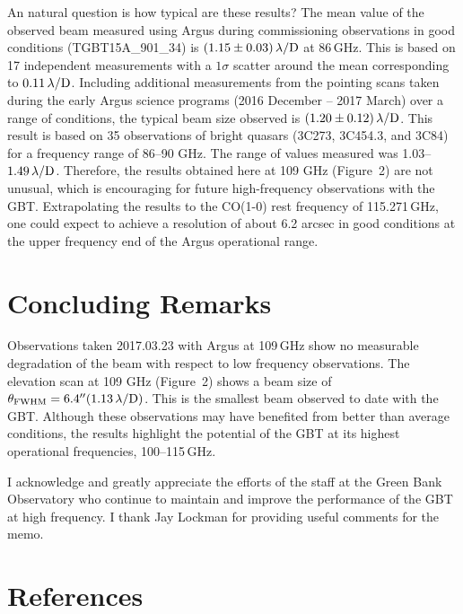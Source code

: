 \documentclass[12pt]{article}
\begin{document}
An natural question is how typical are these results?  The mean value
of the observed beam measured using Argus during commissioning
observations in good conditions (TGBT15A\_901\_34) is
$(1.15\pm0.03)\,\lambda/{\rm D}$ at 86\,GHz.  This is based on 17
independent measurements with a $1\sigma$ scatter around the mean
corresponding to $0.11\,\lambda/{\rm D}$.  Including additional
measurements from the pointing scans taken during the early Argus
science programs (2016 December -- 2017 March) over a range of
conditions, the typical beam size observed is
$(1.20\pm0.12)\,\lambda/{\rm D}$.  This result is based on 35
observations of bright quasars (3C273, 3C454.3, and 3C84) for a
frequency range of 86--90 GHz.  The range of values measured was
1.03--$1.49\,\lambda/{\rm D}$.  Therefore, the results obtained here
at 109 GHz (Figure~2) are not unusual, which is encouraging for future
high-frequency observations with the GBT.  Extrapolating the results
to the CO(1-0) rest frequency of 115.271\,GHz, one could expect to
achieve a resolution of about 6.2 arcsec in good conditions at the
upper frequency end of the Argus operational range.



\section{Concluding Remarks}

Observations taken 2017.03.23 with Argus at 109\,GHz show no
measurable degradation of the beam with respect to low frequency
observations.  The elevation scan at 109 GHz (Figure~2) shows a beam
size of $\theta_{\rm FWHM} = 6.4^{\prime\prime} (1.13\,\lambda/{\rm
  D})$.  This is the smallest beam observed to date with the GBT.
Although these observations may have benefited from better than
average conditions, the results highlight the potential of the GBT at
its highest operational frequencies, 100--115\,GHz.

I acknowledge and greatly appreciate the efforts of the staff at the
Green Bank Observatory who continue to maintain and improve the
performance of the GBT at high frequency.  I thank Jay Lockman for
providing useful comments for the memo.


 
\section{References}
\end{document}
